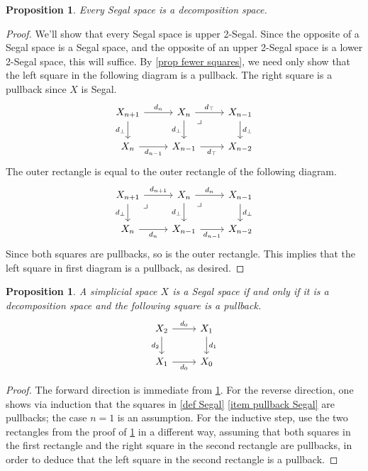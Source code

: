 \documentclass{amsart}
\newtheorem{proposition}[theorem]{Proposition}
\theoremstyle{definition}
\theoremstyle{remark}
\begin{document}
\begin{proposition}\label{segal implies decomposition}
Every Segal space is a decomposition space.
\end{proposition}
\begin{proof}
We'll show that every Segal space is upper 2-Segal.
Since the opposite of a Segal space is a Segal space, and the opposite of an upper 2-Segal space is a lower 2-Segal space, this will suffice.
By \cref{prop fewer squares}, we need only show that the left square in the following diagram is a pullback.
The right square is a pullback since $X$ is Segal.
\[ \begin{tikzcd}
X_{n+1} \rar{d_n} \dar[swap]{d_\bot} &
X_n \rar{d_\top} \dar[swap]{d_\bot} \ar[dr, phantom, "\lrcorner" very near start] & X_{n-1} \dar{d_\bot}
\\
X_n \rar[swap]{d_{n-1}} & 
X_{n-1} \rar[swap]{d_\top} & X_{n-2}
\end{tikzcd} \]
The outer rectangle is equal to the outer rectangle of the following diagram.
\[ \begin{tikzcd}
X_{n+1} \rar{d_{n+1}} \dar[swap]{d_\bot} \ar[dr, phantom, "\lrcorner" very near start] &
X_n \rar{d_n} \dar[swap]{d_\bot} \ar[dr, phantom, "\lrcorner" very near start] & X_{n-1} \dar{d_\bot}
\\
X_n \rar[swap]{d_n} & 
X_{n-1} \rar[swap]{d_{n-1}} & X_{n-2}
\end{tikzcd} \]
Since both squares are pullbacks, so is the outer rectangle.
This implies that the left square in first diagram is a pullback, as desired.
\end{proof}

\begin{proposition}
A simplicial space $X$ is a Segal space if and only if it is a decomposition space and the following square is a pullback.
\[ \begin{tikzcd}
X_2 \rar{d_0} \dar[swap]{d_2} & X_1 \dar{d_1} \\
X_1 \rar[swap]{d_0} & X_0
\end{tikzcd} \]
\end{proposition}
\begin{proof}
The forward direction is immediate from \cref{segal implies decomposition}.
For the reverse direction, one shows via induction that the squares in \cref{def Segal} \eqref{item pullback Segal} are pullbacks; the case $n=1$ is an assumption.
For the inductive step, use the two rectangles from the proof of \cref{segal implies decomposition} in a different way, assuming that both squares in the first rectangle and the right square in the second rectangle are pullbacks, in order to deduce that the left square in the second rectangle is a pullback.
\end{proof}
\end{document}
